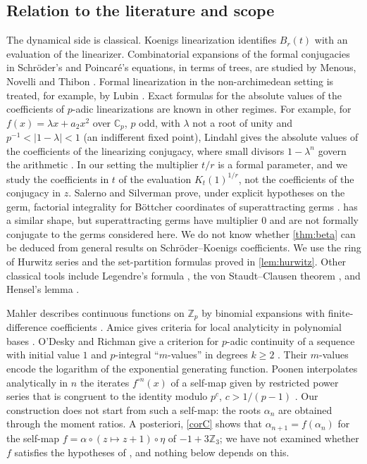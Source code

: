\documentclass[11pt,reqno]{amsart}
\theoremstyle{definition}
\theoremstyle{remark}
\theoremstyle{plain}
\newcommand{\Z}{\mathbb Z}
\begin{document}
\subsection{Relation to the literature and scope}\label{subsec:lit}
The dynamical side is classical. Koenigs linearization \cite{Koenigs1884,Milnor1991} identifies $B_r(t)$ with an evaluation of the linearizer. Combinatorial expansions of the formal conjugacies in Schröder's and Poincaré's equations, in terms of trees, are studied by Menous, Novelli and Thibon \cite{MNT2017}. Formal linearization in the non-archimedean setting is treated, for example, by Lubin \cite[Prop.~1.2]{Lubin1994}. Exact formulas for the absolute values of the coefficients of $p$-adic linearizations are known in other regimes. For example, for $f(x)=\lambda x+a_2x^2$ over $\mathbb C_p$, $p$ odd, with $\lambda$ not a root of unity and $p^{-1}<|1-\lambda|<1$ (an indifferent fixed point), Lindahl gives the absolute values of the coefficients of the linearizing conjugacy, where small divisors $1-\lambda^n$ govern the arithmetic \cite[Thm.~5.1]{Lindahl2009}. In our setting the multiplier $t/r$ is a formal parameter, and we study the coefficients in $t$ of the evaluation $K_t(1)^{1/r}$, not the coefficients of the conjugacy in $z$. Salerno and Silverman prove, under explicit hypotheses on the germ, factorial integrality for Böttcher coordinates of superattracting germs \cite{SalernoSilverman2020}.  has a similar shape, but superattracting germs have multiplier $0$ and are not formally conjugate to the germs considered here. We do not know whether \cref{thm:beta} can be deduced from general results on Schröder–Koenigs coefficients. We use the ring of Hurwitz series \cite[\S2]{Keigher1997} and the set-partition formulas proved in \cref{lem:hurwitz}. Other classical tools include Legendre's formula \cite[Ch.~V, \S3.1]{Robert2000}, the von Staudt–Clausen theorem \cite[Ch.~15, \S1, Thm.~3]{IrelandRosen1990}, and Hensel's lemma \cite[Ch.~I, \S6.4]{Robert2000}.

Mahler describes continuous functions on $\Z_p$ by binomial expansions with finite-difference coefficients \cite[Thm.~1]{Mahler1958}. Amice gives criteria for local analyticity in polynomial bases \cite[Ch.~III, Thms.~2 and 3]{Amice1964}. O'Desky and Richman give a criterion for $p$-adic continuity of a sequence with initial value $1$ and $p$-integral ``$m$-values'' in degrees $k\ge2$ \cite{ODeskyRichman2023}. Their $m$-values encode the logarithm of the exponential generating function. Poonen interpolates analytically in $n$ the iterates $f^{\circ n}(x)$ of a self-map given by restricted power series that is congruent to the identity modulo $p^c$, $c>1/(p-1)$ \cite[Thm.~1]{Poonen2014}. Our construction does not start from such a self-map: the roots $\alpha_n$ are obtained through the moment ratios. A posteriori, \cref{corC} shows that $\alpha_{n+1}=f(\alpha_n)$ for the self-map $f=\alpha\circ(z\mapsto z+1)\circ\eta$ of $-1+3\Z_3$; we have not examined whether $f$ satisfies the hypotheses of \cite{Poonen2014}, and nothing below depends on this.
\end{document}
